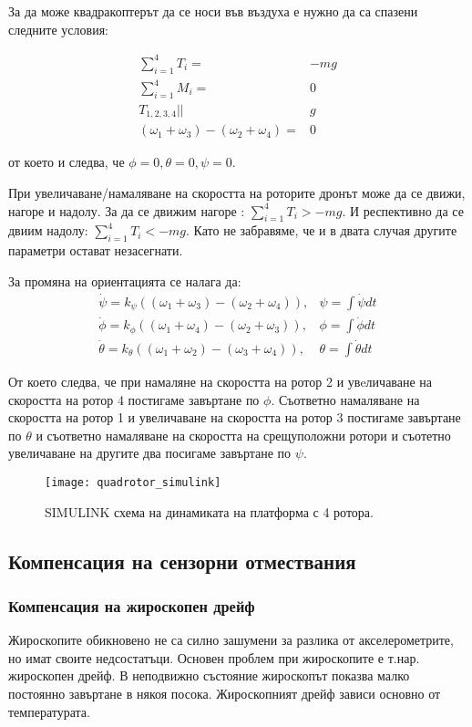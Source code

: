 За да може квадракоптерът да се носи във въздуха е нужно да са спазени следните условия:

\begin{align}
		\sum_{i=1}^{4} T_i  =& -mg \\
		\sum_{i=1}^{4} M_i  =& 0 \\
		T_{1,2,3,4} ||& g \\
		( \omega_1 + \omega_3 ) - ( \omega_2 + \omega_4 ) =& 0 
\end{align}

от което и следва, че \(\phi=0,\theta=0,\psi=0\).

При увеличаване/намаляване на скоростта на роторите дронът може да се движи, нагоре и надолу.
За да се движим нагоре : \(\sum_{i=1}^4 T_i > -mg\).
И респективно да се двиим надолу: \(\sum_{i=1}^4 T_i < -mg\). Като не забравяме, 
че и в двата случая другите параметри остават незасегнати.

За промяна на ориентацията се налага да:
\begin{align}
		\dot{\psi} = k_{\psi}((\omega_1+\omega_3)-(\omega_2 + \omega_4)) ,& \psi = \int \dot{\psi}dt\\
		\dot{\phi} = k_{\phi}((\omega_1 + \omega_4) - (\omega_2+\omega_3 )) ,& \phi = \int \dot{\phi}dt\\
		\dot{\theta} = k_{\theta}((\omega_1+\omega_2) - (\omega_3 +\omega_4)) ,& \theta = \int \dot{\theta}dt
\end{align}


От което следва, че при намаляне на скоростта на ротор 2 и увeличаване на скоростта на ротор 4 постигаме
завъртане по \(\phi\). Съответно намаляване на скоростта на ротор 1 и увеличаване на скоростта на ротор 3 
постигаме завъртане по \(\theta\)  и съответно намаляване на скоростта на срещуположни ротори и съотетно увеличаване на другите два посигаме завъртане по \(\psi\).

\begin{figure}[!h]
    \centering
    \texttt{[image: quadrotor\_simulink]}
    \caption{SIMULINK схема на динамиката на платформа с 4 ротора.}
    \label{fig:quadrotor_simulink}
\end{figure}


\FloatBarrier


\subsection{Компенсация на сензорни отмествания}

\subsubsection{Компенсация на жироскопен дрейф}
\FloatBarrier
Жироскопите обикновено не са силно зашумени за разлика от
акселерометрите, но имат своите недсостатъци.
Основен проблем при жироскопите е т.нар. жироскопен дрейф.
В неподвижно състояние жироскопът показва малко постоянно завъртане в някоя посока.
Жироскопният дрейф зависи основно от температурата.

